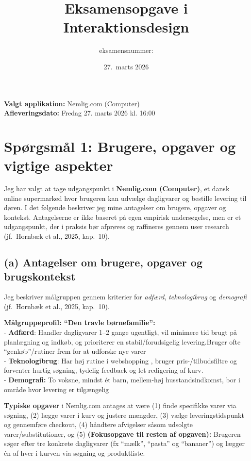 \documentclass[12pt,a4paper]{article}
\title{Eksamensopgave i Interaktionsdesign\\[0.5em]
       \large \appname}
\author{eksamensnummer: }
\date{27.\ marts 2026}
\newcommand{\appname}{Nemlig.com (Computer)}
\begin{document}
\maketitle
\vspace{0.5em}
\noindent
\textbf{Valgt applikation:} \appname\\
\textbf{Afleveringsdato:} Fredag 27. marts 2026 kl. 16:00

\newpage

\section*{Spørgsmål 1: Brugere, opgaver og vigtige aspekter}

Jeg har valgt at tage udgangspunkt i \textbf{Nemlig.com (Computer)}, et dansk online supermarked
hvor brugeren kan udvælge dagligvarer og bestille levering til døren. I det følgende beskriver
jeg mine antagelser om brugere, opgaver og kontekst. Antagelserne er ikke baseret på egen
empirisk undersøgelse, men er et udgangspunkt, der i praksis bør afprøves og raffineres gennem
user research (jf.\ Hornbæk et al., 2025, kap.\ 10).

\subsection*{(a) Antagelser om brugere, opgaver og brugskontekst}
Jeg beskriver målgruppen gennem kriterier for \textit{adfærd},
\textit{teknologibrug} og \textit{demografi} (jf.\ Hornbæk et al., 2025, kap.\ 10).

\textbf{Målgruppeprofil: ``Den travle børnefamilie'':}\\
- \textbf{Adfærd}: Handler dagligvarer 1--2 gange ugentligt, vil minimere tid brugt på planlægning og indkøb, og prioriterer en stabil/forudsigelig levering.Bruger ofte ``genkøb''/rutiner frem for at udforske nye varer\\
- \textbf{Teknologibrug}: Har høj rutine i webshopping , bruger pris-/tilbudsfiltre og forventer hurtig søgning, tydelig feedback og let redigering af kurv.\\
- \textbf{Demografi:} To voksne, mindst ét barn, mellem-høj
        husstandsindkomst, bor i område hvor levering er tilgængelig

\textbf{Typiske opgaver} i Nemlig.com antages at være (1) finde specifikke varer via
søgning, (2) lægge varer i kurv og justere mængder, (3) vælge leveringstidspunkt og
gennemføre checkout, (4) håndtere afvigelser såsom udsolgte varer/substitutioner, og
(5) \textbf{(Fokusopgave til resten af opgaven):} Brugeren søger efter tre konkrete dagligvarer
(fx ``mælk'', ``pasta'' og ``bananer'') og lægger én af hver i kurven via søgning og
produktliste.
\end{document}
